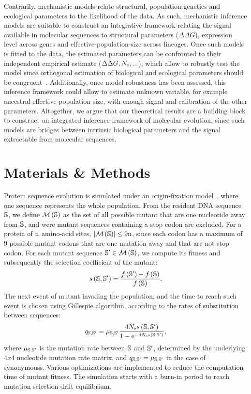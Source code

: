 Contrarily, mechanistic models relate structural, population-genetics and ecological parameters to the \gls{likelihood} of the data.
As such, mechanistic inference models are suitable to construct an integrative framework relating the signal available in molecular sequences to structural parameters ($\Delta \Delta G$), expression level across genes and \gls{effective-population-size} across lineages.
Once such models is fitted to the data, the estimated parameters can be confronted to their independent empirical estimate ($\Delta \Delta G, N_{\mathrm{e}}, ...$), which allow to robustly test the model since orthogonal estimation of biological and ecological parameters should be congruent~\citep{Dasmeh2014}.
Additionally, once model robustness has been assessed, this inference framework could allow to estimate unknown variable, for example ancestral \gls{effective-population-size}, with enough signal and calibration of the other parameters.
Altogether, we argue that our theoretical results are a building block to construct an integrated inference framework of molecular evolution, since such models are bridges between intrinsic biological parameters and the signal extractable from molecular sequences.


\section{Materials \& Methods}
Protein sequence evolution is simulated under an origin-fixation model~\citep{McCandlish2014}, where one sequence represents the whole population.
From the resident \acrshort{DNA} sequence $\mathbb{S}$, we define $\mathcal{M}\left(\mathbb{S}\right)$ as the set of all possible mutant that are one nucleotide away from $\mathbb{S}$, and were mutant sequences containing a stop \gls{codon} are excluded.
For a protein of $\text{n}$ amino-acid sites, $\left| \mathcal{M}\left(\mathbb{S}\right) \right| \leq 9 \text{n}$, since each \gls{codon} has a maximum of $9$ possible mutant \glspl{codon} that are one mutation away and that are not stop \gls{codon}.
For each mutant sequence $\mathbb{S}' \in \mathcal{M}\left(\mathbb{S}\right)$, we compute its fitness and subsequently the selection coefficient of the mutant:
\begin{equation}
    s \left( \mathbb{S},\mathbb{S}'\right) = \dfrac{ f \left(\mathbb{S}' \right) - f \left(\mathbb{S}\right) }{f\left( \mathbb{S}\right)}.
\end{equation}
The next event of mutant invading the population, and the time to reach such event is chosen using Gillespie algorithm, according to the rates of \gls{substitution} between sequences:
\begin{equation}
    q_{\mathbb{S}, \mathbb{S}'} = \mu_{\mathbb{S}, \mathbb{S}'} \dfrac{4 N_{\mathrm{e}} s \left( \mathbb{S},\mathbb{S}'\right)}{1 - \mathrm{e}^{-4 N_{\mathrm{e}} s \left( \mathbb{S},\mathbb{S}'\right)}},
\end{equation}
where $\mu_{\mathbb{S}, \mathbb{S}'}$ is the mutation rate between $\mathbb{S}$ and $\mathbb{S}'$, determined by the underlying $4x4$ nucleotide mutation rate matrix, and ${q_{\mathbb{S}, \mathbb{S}'}} = \mu_{\mathbb{S}, \mathbb{S}'}$ in the case of \glspl{synonymous}.
Various optimizations are implemented to reduce the computation time of mutant fitness.
The simulation starts with a burn-in period to reach mutation-selection-drift equilibrium.

